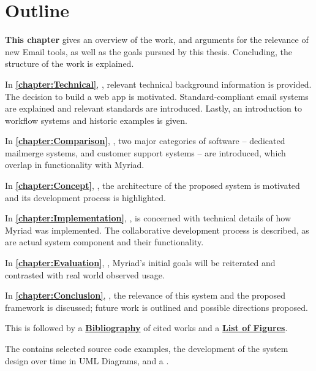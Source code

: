 \section{Outline}

\textbf{This chapter} gives an overview of the work, and arguments for the relevance of new Email tools, as well as the goals pursued by this thesis. Concluding, the structure of the work is explained.

In \textbf{\autoref{chapter:Technical}}, \textbf{}, relevant technical background information is provided. The decision to build a web app is motivated. Standard-compliant email systems are explained and relevant standards are introduced. Lastly, an introduction to workflow systems and historic examples is given.

In \textbf{\autoref{chapter:Comparison}}, \textbf{},  two major categories of software -- dedicated mailmerge systems, and customer support systems -- are introduced, which overlap in functionality with Myriad.

In \textbf{\autoref{chapter:Concept}}, \textbf{}, the architecture of the proposed system is motivated and its development process is highlighted.

In \textbf{\autoref{chapter:Implementation}}, \textbf{}, is concerned with technical details of how Myriad was implemented. The collaborative development process is described, as are actual system component and their functionality.

In \textbf{\autoref{chapter:Evaluation}}, \textbf{}, Myriad's initial goals will be reiterated and contrasted with real world observed usage.

In \textbf{\autoref{chapter:Conclusion}}, \textbf{},  the relevance of this system and the proposed framework is discussed; future work is outlined and possible directions proposed.

This is followed by a \textbf{\hyperref[chapter:Bibliography]{Bibliography}} of cited works and a \textbf{\hyperref[chapter:Figures]{List of Figures}}.

The \textbf{} contains selected source code examples, the development of the system design over time in UML Diagrams, and a \textbf{}.

